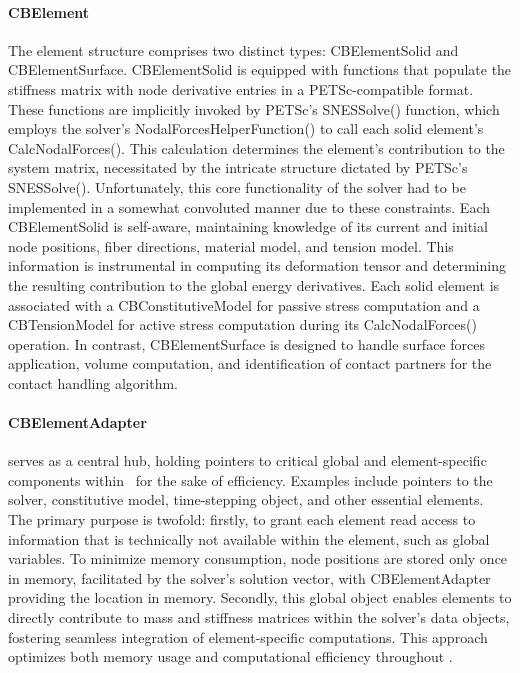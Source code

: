 \paragraph{CBElement} The element structure comprises two distinct types: CBElementSolid and CBElementSurface. 
CBElementSolid is equipped with functions that populate the stiffness matrix with node derivative entries in a PETSc-compatible format. 
These functions are implicitly invoked by PETSc's SNESSolve() function, which employs the solver's NodalForcesHelperFunction() to call each solid element's CalcNodalForces(). 
This calculation determines the element's contribution to the system matrix, necessitated by the intricate structure dictated by PETSc's SNESSolve(). 
Unfortunately, this core functionality of the solver had to be implemented in a somewhat convoluted manner due to these constraints.
Each CBElementSolid is self-aware, maintaining knowledge of its current and initial node positions, fiber directions, material model, and tension model. 
This information is instrumental in computing its deformation tensor and determining the resulting contribution to the global energy derivatives. 
Each solid element is associated with a CBConstitutiveModel for passive stress computation and a CBTensionModel for active stress computation during its CalcNodalForces() operation.
In contrast, CBElementSurface is designed to handle surface forces application, volume computation, and identification of contact partners for the contact handling algorithm.

\paragraph{CBElementAdapter} serves as a central hub, holding pointers to critical global and element-specific components within \CM~for the sake of efficiency. 
Examples include pointers to the solver, constitutive model, time-stepping object, and other essential elements. 
The primary purpose is twofold: firstly, to grant each element read access to information that is technically not available within the element, such as global variables. 
To minimize memory consumption, node positions are stored only once in memory, facilitated by the solver's solution vector, with CBElementAdapter providing the location in memory.
Secondly, this global object enables elements to directly contribute to mass and stiffness matrices within the solver's data objects, fostering seamless integration of element-specific computations. 
This approach optimizes both memory usage and computational efficiency throughout \CM.

